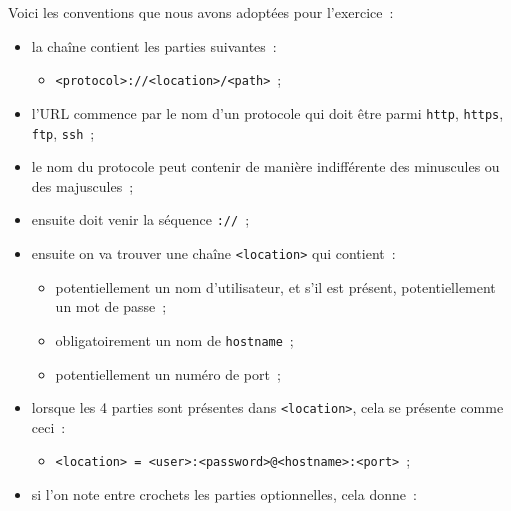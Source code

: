 Voici les conventions que nous avons adoptées pour l'exercice~:

\begin{itemize}
\tightlist
\item
  la chaîne contient les parties suivantes~:

  \begin{itemize}
  \tightlist
  \item
    \texttt{\textless{}protocol\textgreater{}://\textless{}location\textgreater{}/\textless{}path\textgreater{}}~;
  \end{itemize}
\item
  l'URL commence par le nom d'un protocole qui doit être parmi
  \texttt{http}, \texttt{https}, \texttt{ftp}, \texttt{ssh}~;
\item
  le nom du protocole peut contenir de manière indifférente des
  minuscules ou des majuscules~;
\item
  ensuite doit venir la séquence \texttt{://}~;
\item
  ensuite on va trouver une chaîne
  \texttt{\textless{}location\textgreater{}} qui contient~:

  \begin{itemize}
  \tightlist
  \item
    potentiellement un nom d'utilisateur, et s'il est présent,
    potentiellement un mot de passe~;
  \item
    obligatoirement un nom de \texttt{hostname}~;
  \item
    potentiellement un numéro de port~;
  \end{itemize}
\item
  lorsque les 4 parties sont présentes dans
  \texttt{\textless{}location\textgreater{}}, cela se présente comme
  ceci~:

  \begin{itemize}
  \tightlist
  \item
    \texttt{\textless{}location\textgreater{}\ =\ \textless{}user\textgreater{}:\textless{}password\textgreater{}@\textless{}hostname\textgreater{}:\textless{}port\textgreater{}}~;
  \end{itemize}
\item
  si l'on note entre crochets les parties optionnelles, cela donne~:


\end{itemize}
